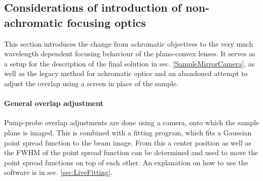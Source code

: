 \documentclass[twoside,openright,listof=numbered]{scrreprt}
\begin{document}
\subsection{Considerations of introduction of non-achromatic focusing optics}
This section introduces the change from achromatic objectives to the very much wavelength dependent focusing behaviour of the plano-convex lenses. It serves as a setup for the description of the final solution in sec. \ref{SampleMirrorCamera}, as well as the legacy method for achromatic optics and an abandoned attempt to adjust the overlap using a screen in place of the sample.

\paragraph{General overlap adjustment}
Pump-probe overlap adjustments are done using a camera, onto which the sample plane is imaged. This is combined with a fitting program, which fits a Gaussian point spread function to the beam image. From this a center position as well as the FWHM of the point spread function can be determined and used to move the point spread functions on top of each other. An explanation on how to use the software is in sec. \ref{sec:LiveFitting}.
\end{document}
